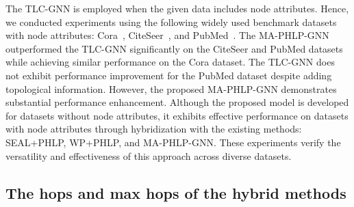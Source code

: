 The TLC-GNN is employed when the given data includes node attributes.
Hence, we conducted experiments using the following widely used benchmark datasets with node attributes: Cora~\cite{mccallum2000automating}, CiteSeer~\cite{giles1998citeseer}, and PubMed~\cite{namata2012query}. 
The MA-PHLP-GNN outperformed the TLC-GNN significantly on the CiteSeer and PubMed datasets while achieving similar performance on the Cora dataset. 
The TLC-GNN does not exhibit performance improvement for the PubMed dataset despite adding topological information. 
However, the proposed MA-PHLP-GNN demonstrates substantial performance enhancement.
Although the proposed model is developed for datasets without node attributes, it exhibits effective performance on datasets with node attributes through hybridization with the existing methods: SEAL+PHLP, WP+PHLP, and MA-PHLP-GNN. 
These experiments verify the versatility and effectiveness of this approach across diverse datasets.

\subsection{The hops and max hops of the hybrid methods}
\label{hop_analysis}

